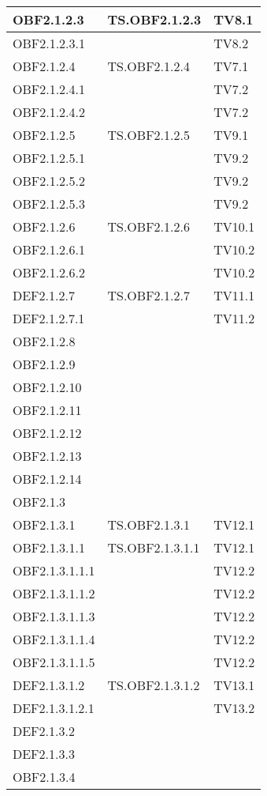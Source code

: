 \documentclass{scalatekids-article}
\begin{document}
\begin{longtable}[H]{|l|p{4cm}|p{4cm}|}
  OBF2.1.2.3 & TS.OBF2.1.2.3 & TV8.1\\
  \hline
  OBF2.1.2.3.1 & & TV8.2\\
  \hline
  OBF2.1.2.4 & TS.OBF2.1.2.4 & TV7.1\\
  \hline
  OBF2.1.2.4.1 & & TV7.2\\
  \hline
  OBF2.1.2.4.2 & & TV7.2\\
  \hline
  OBF2.1.2.5 & TS.OBF2.1.2.5 & TV9.1\\
  \hline
  OBF2.1.2.5.1 & & TV9.2\\
  \hline
  OBF2.1.2.5.2 & & TV9.2\\
  \hline
  OBF2.1.2.5.3 & & TV9.2\\
  \hline
  OBF2.1.2.6 & TS.OBF2.1.2.6 & TV10.1\\
  \hline
  OBF2.1.2.6.1 & & TV10.2\\
  \hline
  OBF2.1.2.6.2 & & TV10.2\\
  \hline
  DEF2.1.2.7 & TS.OBF2.1.2.7 & TV11.1\\
  \hline
  DEF2.1.2.7.1 & & TV11.2\\
  \hline
  OBF2.1.2.8 &  &\\
  \hline
  OBF2.1.2.9 &  &\\
  \hline
  OBF2.1.2.10 &  &\\
  \hline
  OBF2.1.2.11 &  &\\
  \hline
  OBF2.1.2.12 &  &\\
  \hline
  OBF2.1.2.13 &  &\\
  \hline
  OBF2.1.2.14 &  &\\
  \hline
  OBF2.1.3 &  &\\
  \hline
  OBF2.1.3.1 & TS.OBF2.1.3.1 & TV12.1\\
  \hline
  OBF2.1.3.1.1 & TS.OBF2.1.3.1.1 & TV12.1\\
  \hline
  OBF2.1.3.1.1.1 & & TV12.2\\
  \hline
  OBF2.1.3.1.1.2 & & TV12.2\\
  \hline
  OBF2.1.3.1.1.3 & & TV12.2\\
  \hline
  OBF2.1.3.1.1.4 & & TV12.2\\
  \hline
  OBF2.1.3.1.1.5 & & TV12.2\\
  \hline
  DEF2.1.3.1.2 & TS.OBF2.1.3.1.2 & TV13.1\\
  \hline
  DEF2.1.3.1.2.1 & & TV13.2\\
  \hline
  DEF2.1.3.2 & &\\ %
  \hline
  DEF2.1.3.3 & &\\ %
  \hline
  OBF2.1.3.4 & &\\ %

\end{longtable}
\end{document}
